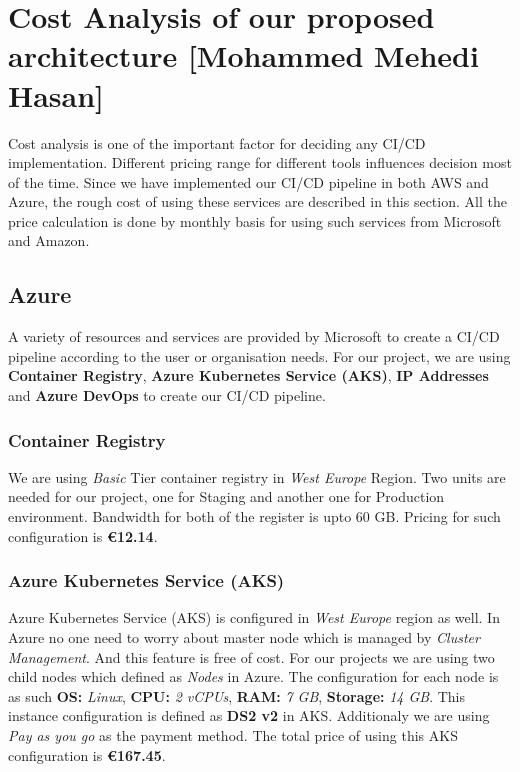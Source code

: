 \section{Cost Analysis of our proposed architecture [Mohammed Mehedi Hasan]}

Cost analysis is one of the important factor for deciding any CI/CD implementation. Different pricing range for different tools influences decision most of the time. Since we have implemented our CI/CD pipeline in both AWS and Azure, the rough cost of using these services are described in this section. All the price calculation is done by monthly basis for using such services from Microsoft and Amazon.

\subsection{Azure}

A variety of resources and services are provided by Microsoft to create a CI/CD pipeline according to the user or organisation needs. For our project, we are using \textbf{Container Registry}, \textbf{Azure Kubernetes Service (AKS)}, \textbf{IP Addresses} and \textbf{Azure DevOps} to create our CI/CD pipeline.

\subsubsection{Container Registry}

We are using \textit{Basic} Tier container registry in \textit{West Europe} Region. Two units are needed for our project, one for Staging and another one for Production environment. Bandwidth for both of the register is upto 60 GB. Pricing for such configuration is \textbf{€12.14}.

\subsubsection{Azure Kubernetes Service (AKS)}

Azure Kubernetes Service (AKS) is configured in \textit{West Europe} region as well. In Azure no one need to worry about master node which is managed by \textit{Cluster Management}. And this feature is free of cost. For our projects we are using two child nodes which defined as \textit{Nodes} in Azure. The configuration for each node is as such \textbf{OS:} \textit{Linux}, \textbf{CPU:} \textit{2 vCPUs}, \textbf{RAM:} \textit{7 GB}, \textbf{Storage:} \textit{14 GB}. This instance configuration is defined as \textbf{DS2 v2} in AKS. Additionaly we are using \textit{Pay as you go} as the payment method. The total price of using this AKS configuration is \textbf{€167.45}.

